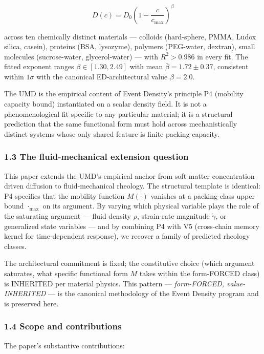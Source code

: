 \documentclass[
  11pt,a4paper]{article}
\begin{document}
\[D(c) = D_0 \left(1 - \frac{c}{c_\mathrm{max}}\right)^\beta\]

across ten chemically distinct materials --- colloids (hard-sphere,
PMMA, Ludox silica, casein), proteins (BSA, lysozyme), polymers
(PEG-water, dextran), small molecules (sucrose-water, glycerol-water)
--- with \(R^2 > 0.986\) in every fit. The fitted exponent ranges
\(\beta \in [1.30, 2.49]\) with mean \(\bar\beta = 1.72 \pm 0.37\),
consistent within \(1\sigma\) with the canonical ED-architectural value
\(\beta = 2.0\).

The UMD is the empirical content of Event Density's principle P4
(mobility capacity bound) instantiated on a scalar density field. It is
not a phenomenological fit specific to any particular material; it is a
structural prediction that the same functional form must hold across
mechanistically distinct systems whose only shared feature is finite
packing capacity.

\subsubsection{1.3 The fluid-mechanical extension
question}\label{the-fluid-mechanical-extension-question}

This paper extends the UMD's empirical anchor from soft-matter
concentration-driven diffusion to fluid-mechanical rheology. The
structural template is identical: P4 specifies that the mobility
function \(M(\cdot)\) vanishes at a packing-class upper bound
\(\cdot_\mathrm{max}\) on its argument. By varying which physical
variable plays the role of the saturating argument --- fluid density
\(\rho\), strain-rate magnitude \(\dot\gamma\), or generalized state
variables --- and by combining P4 with V5 (cross-chain memory kernel for
time-dependent response), we recover a family of predicted rheology
classes.

The architectural commitment is fixed; the constitutive choice (which
argument saturates, what specific functional form \(M\) takes within the
form-FORCED class) is INHERITED per material physics. This pattern ---
\emph{form-FORCED, value-INHERITED} --- is the canonical methodology of
the Event Density program and is preserved here.

\subsubsection{1.4 Scope and
contributions}\label{scope-and-contributions}

The paper's substantive contributions:
\end{document}
